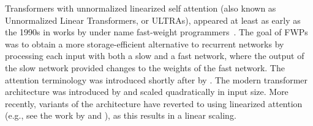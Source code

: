 Transformers with unnormalized linearized self attention (also known as Unnormalized Linear Transformers, or ULTRAs), appeared at least as early as the 1990s in works by \cite{schmidhuber1992learningFWP,schmidhuber1991learningFWP} under name fast-weight programmers~\citep{schlag2021linear}.
The goal of FWPs was to obtain a more storage-efficient alternative to recurrent networks by processing each input with both a slow and a fast network, where the output of the slow network provided changes to the weights of the fast network.
The attention terminology was introduced shortly after by \citet{schmidhuber1993reducing}.
The modern transformer architecture was introduced by \citet{vaswani2017attention} and scaled quadratically in input size.
More recently, variants of the \citet{vaswani2017attention} architecture have reverted to using linearized attention (e.g., see the work by \citet{katharopoulos2020transformers} and \citet{choromanski2020rethinking}), as this results in a linear scaling.
